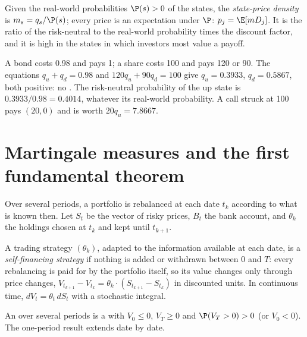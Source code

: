 \begin{definition}\label{def:dv:no-arbitrage-and-the-fundamental-theorems:spd}
Given the real-world probabilities $\P(s)>0$ of the states, the
\emph{state-price density} is $m_s=q_s/\P(s)$; every
price is an expectation under $\P$: $p_j=\E[mD_j]$. It is the ratio of the
risk-neutral to the real-world probability times the discount factor, and it is
high in the states in which investors most value a payoff.
\end{definition}

\begin{example}\label{ex:dv:no-arbitrage-and-the-fundamental-theorems:binomial}
A bond costs 0.98 and pays 1; a share costs 100 and pays 120 or 90. The
equations $q_u+q_d=0.98$ and $120q_u+90q_d=100$ give $q_u=0.3933$, $q_d=0.5867$,
both positive: no . The risk-neutral probability of the up state is
$0.3933/0.98=0.4014$, whatever its real-world probability. A call struck at 100
pays $(20,0)$ and is worth $20q_u=7.8667$.
\end{example}

\section{Martingale measures and the first fundamental theorem}

Over several periods, a portfolio is rebalanced at each date $t_k$ according to
what is known then. Let $S_t$ be the vector of risky prices, $B_t$ the bank
account, and $\theta_k$ the holdings chosen at $t_k$ and kept until $t_{k+1}$.

\begin{definition}\label{def:dv:no-arbitrage-and-the-fundamental-theorems:sf}
A trading strategy $(\theta_k)$, adapted to the information available at each
date, is a \emph{self-financing strategy} if
nothing is added or withdrawn between $0$ and $T$: every rebalancing is paid for
by the portfolio itself, so its value changes only through price changes,
$V_{t_{k+1}}-V_{t_k}=\theta_k\cdot(S_{t_{k+1}}-S_{t_k})$ in discounted units. In
continuous time, $dV_t=\theta_t\,dS_t$ with a stochastic integral.
\end{definition}

An  over several periods is a  with $V_0\le0$,
$V_T\ge0$ and $\P(V_T>0)>0$ (or $V_0<0$). The one-period result extends date
by date.

